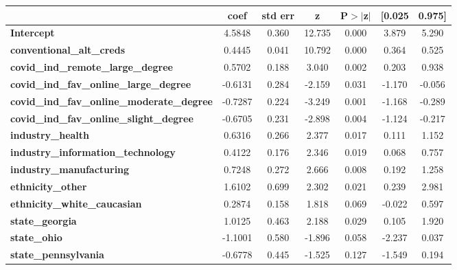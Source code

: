 {    %
    \begin{tabular}{lcccccc}
    \toprule
                                                       & \textbf{coef} & \textbf{std err} & \textbf{z} & \textbf{P$> |$z$|$} & \textbf{[0.025} & \textbf{0.975]}  \\
    \midrule
    \textbf{Intercept}                                 &       4.5848  &        0.360     &    12.735  &         0.000        &        3.879    &        5.290     \\
    \textbf{conventional\_alt\_creds}                  &       0.4445  &        0.041     &    10.792  &         0.000        &        0.364    &        0.525     \\
    \textbf{covid\_ind\_remote\_large\_degree}         &       0.5702  &        0.188     &     3.040  &         0.002        &        0.203    &        0.938     \\
    \textbf{covid\_ind\_fav\_online\_large\_degree}    &      -0.6131  &        0.284     &    -2.159  &         0.031        &       -1.170    &       -0.056     \\
    \textbf{covid\_ind\_fav\_online\_moderate\_degree} &      -0.7287  &        0.224     &    -3.249  &         0.001        &       -1.168    &       -0.289     \\
    \textbf{covid\_ind\_fav\_online\_slight\_degree}   &      -0.6705  &        0.231     &    -2.898  &         0.004        &       -1.124    &       -0.217     \\
    \textbf{industry\_health}                          &       0.6316  &        0.266     &     2.377  &         0.017        &        0.111    &        1.152     \\
    \textbf{industry\_information\_technology}         &       0.4122  &        0.176     &     2.346  &         0.019        &        0.068    &        0.757     \\
    \textbf{industry\_manufacturing}                   &       0.7248  &        0.272     &     2.666  &         0.008        &        0.192    &        1.258     \\
    \textbf{ethnicity\_other}                          &       1.6102  &        0.699     &     2.302  &         0.021        &        0.239    &        2.981     \\
    \textbf{ethnicity\_white\_caucasian}               &       0.2874  &        0.158     &     1.818  &         0.069        &       -0.022    &        0.597     \\
    \textbf{state\_georgia}                            &       1.0125  &        0.463     &     2.188  &         0.029        &        0.105    &        1.920     \\
    \textbf{state\_ohio}                               &      -1.1001  &        0.580     &    -1.896  &         0.058        &       -2.237    &        0.037     \\
    \textbf{state\_pennsylvania}                       &      -0.6778  &        0.445     &    -1.525  &         0.127        &       -1.549    &        0.194     \\
    \bottomrule
    \end{tabular}
}
